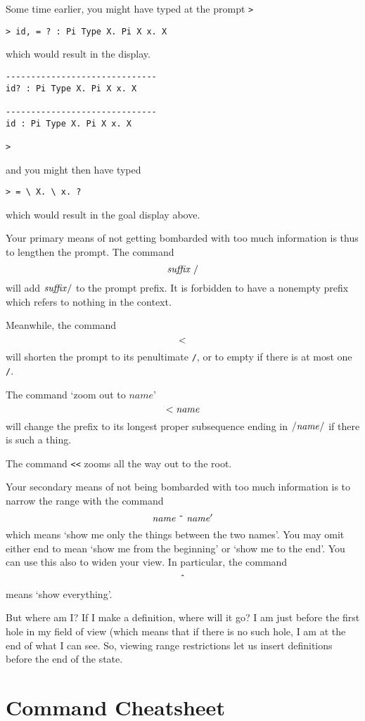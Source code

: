 \documentclass{article}
\begin{document}
Some time earlier, you might have typed at the prompt {\tt >}
\begin{verbatim}
> id, = ? : Pi Type X. Pi X x. X
\end{verbatim}
which would result in the display.
\begin{verbatim}
------------------------------
id? : Pi Type X. Pi X x. X

------------------------------
id : Pi Type X. Pi X x. X

>
\end{verbatim}
and you might then have typed
\begin{verbatim}
> = \ X. \ x. ?
\end{verbatim}
which would result in the goal display above.

Your primary means of not getting bombarded with too much information is thus
to lengthen the prompt. The command
\[
\mathit{suffix}\;{\tt /}
\]
will add $\mathit{suffix}{\tt /}$ to the prompt prefix. It is forbidden
to have a nonempty prefix which refers to nothing in the context.

Meanwhile, the command
\[
{\tt <}
\]
will shorten the prompt to its penultimate {\tt /}, or to empty if there is at most
one {\tt /}.

The command `zoom out to $\mathit{name}$'
\[
{\tt <}\;\mathit{name}
\]
will change the prefix to its longest proper subsequence ending in
${\tt /}\mathit{name}{\tt /}$
if there is such a thing.

The command {\tt <<} zooms all the way out to the root.

Your secondary means of not being bombarded with too much information is to narrow
the range with the command
\[
\mathit{name}\;\mbox{\tt \^{}}\;\mathit{name}'
\]
which means `show me only the things between the two names'. You may omit either end
to mean `show me from the beginning' or `show me to the end'. You can use this also to
widen your view. In particular, the command
\[
\mbox{\tt \^{}}
\]
means `show everything'.

But where am I? If I make a definition, where will it go? I am just before
the first hole in my field of view (which means that if there is no such hole, I am at the
end of what I can see. So, viewing range restrictions let us insert definitions
before the end of the state.



\newpage\appendix

\section{Command Cheatsheet}
\end{document}
